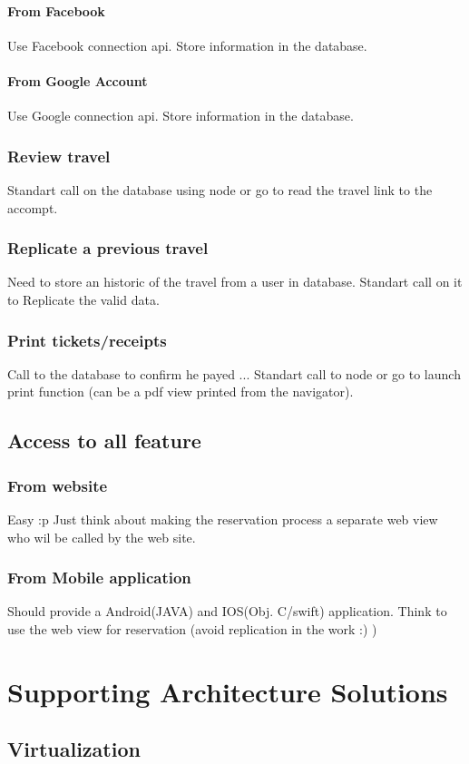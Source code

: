 \documentclass[a4paper,10pt]{report}
\begin{document}
      \subsection{From Facebook}
	Use Facebook connection api. Store information in the database.
      \subsection{From Google Account}
	Use Google connection api. Store information in the database.
    \section {Review travel}
      Standart call on the database using node or go to read the travel link to the accompt.
    \section{Replicate a previous travel}
      Need to store an historic of the travel from a user in database. Standart call on it to Replicate the valid data.
    \section{Print tickets/receipts}
      Call to the database to confirm he payed ... Standart call to node or go to launch print function (can be a pdf view printed from the navigator).
  \chapter{Access to all feature}
    \section{From website}
      Easy :p Just think about making the reservation process a separate web view who wil be called by the web site.
    \section{From Mobile application}
      Should provide a Android(JAVA) and IOS(Obj. C/swift) application. Think to use the web view for reservation (avoid replication in the work :) )
\part{Supporting Architecture Solutions}
  \chapter{Virtualization}
\end{document}
